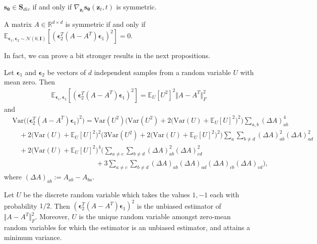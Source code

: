 \documentclass{article}
\theoremstyle{definition}
\theoremstyle{remark}
\begin{document}
	\begin{proposition}\label{prop:1}
		$\mathbf{s}_{\bm{\theta}}\in\mathbf{S}_{div}$ if and only if $\nabla_{\mathbf{z}_{t}}\mathbf{s}_{\bm{\theta}}(\mathbf{z}_{t},t)$ is symmetric.
	\end{proposition}
	
	\begin{proposition}\label{prop:2}
		A matrix $A\in\mathbb{R}^{d\times d}$ is symmetric if and only if $\mathbb{E}_{\bm{\epsilon}_{1},\bm{\epsilon}_{2}\sim\mathcal{N}(0,\mathbf{I})}\left[ (\bm{\epsilon}_{2}^{T}(A-A^{T})\bm{\epsilon}_{1})^{2}\right]=0$.
	\end{proposition}
	
	In fact, we can prove a bit stronger results in the next propositions.
	
	\begin{proposition}\label{prop:3}
		Let $\bm{\epsilon}_{1}$ and $\bm{\epsilon}_{2}$ be vectors of $d$ independent samples from a random variable $U$ with mean zero. Then
		\begin{align*}
		\mathbb{E}_{\bm{\epsilon}_{1},\bm{\epsilon}_{2}}[(\bm{\epsilon}_{2}^{T}(A-A^{T})\bm{\epsilon}_{1})^{2}]=\mathbb{E}_{U}[U^{2}]^{2}\Vert A-A^{T}\Vert_{F}^{2}
		\end{align*}
		and
		\begin{align*}
		&\text{Var}\Big(\big(\bm{\epsilon}_{2}^{T}(A-A^{T})\bm{\epsilon}_{1}\big)^{2}\Big)=\text{Var}(U^{2})\Big(\text{Var}(U^{2})+2\big(\text{Var}(U)+\mathbb{E}_{U}[U]^{2}\big)^{2}\Big)\sum_{a,b}(\Delta A)_{ab}^{4}\\
		&\quad+2\big(\text{Var}(U)+\mathbb{E}_{U}[U]^{2}\big)^{2}\Big(3\text{Var}(U^{2})+2\big(\text{Var}(U)+\mathbb{E}_{U}[U]^{2}\big)^{2}\Big)\sum_{a}\sum_{b\ne d}(\Delta A)_{ab}^{2}(\Delta A)_{ad}^{2}\\
		&\quad+2\big(\text{Var}(U)+\mathbb{E}_{U}[U]^{2}\big)^{4}\Big(\sum_{a\neq c}\sum_{b\neq d}(\Delta A)_{ab}^{2}(\Delta A)_{cd}^{2}\\
		&\quad\quad\quad\quad\quad\quad\quad\quad\quad\quad\quad\quad+3\sum_{a\ne c}\sum_{b\ne d}(\Delta A)_{ab}(\Delta A)_{ad}(\Delta A)_{cb}(\Delta A)_{cd}\Big),
		\end{align*}
		where $(\Delta A)_{ab}:=A_{ab}-A_{ba}$.
	\end{proposition}
	
	\begin{proposition}\label{prop:4}
		Let $U$ be the discrete random variable which takes the values $1,-1$ each with probability $1/2$. Then $(\bm{\epsilon}_{2}^{T}(A-A^{T})\bm{\epsilon}_{1})^{2}$ is the unbiased estimator of $\Vert A-A^{T}\Vert_{F}^{2}$.
		Moreover, $U$ is the unique random variable amongst zero-mean random variables for which the estimator is an unbiased estimator, and attains a minimum variance.
	\end{proposition}
	
\end{document}
